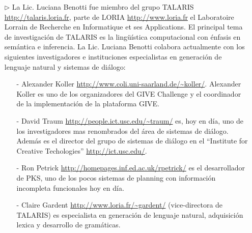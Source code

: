 \begin{itemize}
\begin{itemize}
\end{itemize}
 \item[$\triangleright$] La Lic. Luciana Benotti fue miembro
del grupo TALARIS \url{http://talaris.loria.fr}, parte de
LORIA \url{http://www.loria.fr} el Laboratoire Lorrain de Recherche en Informatique et ses Applications. El principal tema de investigaci\'on de TALARIS es la ling\"u\'istica
computacional con \'enfasis en sem\'antica e inferencia. La Lic. Luciana Benotti colabora actualmente con los siguientes investigadores e instituciones
especialistas en generaci\'on de lenguaje natural y sistemas de di\'alogo:
\begin{itemize}
    \item[-]  Alexander Koller \url{http://www.coli.uni-saarland.de/~koller/}.
Alexander Koller es uno de los organizadores del GIVE Challenge y el
coordinador de la implementaci\'on de la plataforma GIVE.
    \item[-] David Traum \url{http://people.ict.usc.edu/~traum/} es, hoy en d\'ia, uno
de los investigadores mas renombrados del \'area de sistemas de di\'alogo.
Adem\'as es el director del grupo de sistemas de di\'alogo en el ``Institute
for Creative Techologies'' \url{http://ict.usc.edu/}.
\item[-] Ron Petrick \url{http://homepages.inf.ed.ac.uk/rpetrick/} es el
desarrollador de PKS, uno de los pocos sistemas de planning con informaci\'on
incompleta funcionales hoy en d\'ia.
\item[-] Claire Gardent \url{http://www.loria.fr/~gardent/} (vice-directora de
TALARIS) es especialista en generaci\'on de lenguaje natural, adquisici\'on
lexica y desarrollo de gram\'aticas.

\end{itemize}
\end{itemize}



